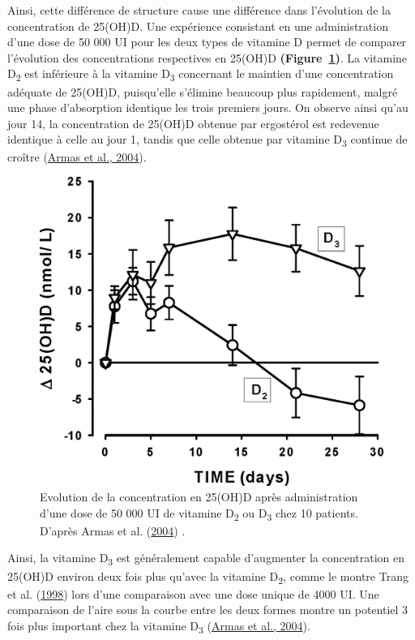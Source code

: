 \documentclass[
  a4paper,
  DIV=11,
  numbers=noendperiod,
  listof=totoc]{scrreprt}
\begin{document}
Ainsi, cette différence de structure cause une différence dans
l'évolution de la concentration de 25(OH)D. Une expérience consistant en
une administration d'une dose de 50 000 UI pour les deux types de
vitamine D permet de comparer l'évolution des concentrations respectives
en 25(OH)D \textbf{(Figure~\ref{fig-PK-VD})}. La vitamine
D\textsubscript{2} est inférieure à la vitamine D\textsubscript{3}
concernant le maintien d'une concentration adéquate de 25(OH)D,
puisqu'elle s'élimine beaucoup plus rapidement, malgré une phase
d'absorption identique les trois premiers jours. On observe ainsi qu'au
jour 14, la concentration de 25(OH)D obtenue par ergostérol est
redevenue identique à celle au jour 1, tandis que celle obtenue par
vitamine D\textsubscript{3} continue de croître
(\protect\hyperlink{ref-Armas.2004}{Armas et al., 2004}).

\begin{figure}

{\centering \includegraphics{figures/PK_D2_vs_D3.jpeg}

}

\caption{\label{fig-PK-VD}Evolution de la concentration en 25(OH)D après
administration d'une dose de 50 000 UI de vitamine D\textsubscript{2} ou
D\textsubscript{3} chez 10 patients. D'après Armas et al.
(\protect\hyperlink{ref-Armas.2004}{2004}) .}

\end{figure}

Ainsi, la vitamine D\textsubscript{3} est généralement capable
d'augmenter la concentration en 25(OH)D environ deux fois plus qu'avec
la vitamine D\textsubscript{2}, comme le montre Trang et al.
(\protect\hyperlink{ref-Trang.1998}{1998}) lors d'une comparaison avec
une dose unique de 4000 UI. Une comparaison de l'aire sous la courbe
entre les deux formes montre un potentiel 3 fois plus important chez la
vitamine D\textsubscript{3} (\protect\hyperlink{ref-Armas.2004}{Armas et
al., 2004}).
\end{document}
